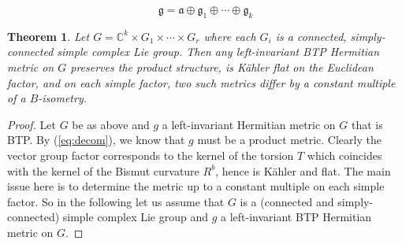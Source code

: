\documentclass[10pt,a4paper]{amsart}
\newtheorem{theorem}{Theorem}
\begin{document}
\begin{equation}
 {\mathfrak g} = {\mathfrak a} \oplus {\mathfrak g}_1 \oplus \cdots \oplus {\mathfrak g}_k \label{eq:decom}
 \end{equation}

\begin{theorem} \label{thm2.6}
Let $G={\mathbb C}^k \times G_1\times \cdots \times G_r$ where each $G_i$ is a connected, simply-connected simple complex Lie group. Then any left-invariant {\rm BTP} Hermitian metric on $G$ preserves the product structure, is K\"ahler flat on the Euclidean factor, and on each simple factor, two such metrics differ by a constant multiple of a $B$-isometry.
\end{theorem}

\begin{proof} Let $G$ be as above and $g$ a left-invariant Hermitian metric on $G$ that is {\rm BTP}. By (\ref{eq:decom}), we know that $g$ must be a product metric. Clearly the vector group factor corresponds to the kernel of the torsion $T$ which coincides with the kernel of the Bismut curvature $R^b$, hence is K\"ahler and flat. The main issue here is to determine the metric up to a constant multiple on each simple factor. So in the following let us assume that $G$ is a (connected and simply-connected) simple complex Lie group and $g$ a left-invariant {\rm BTP} Hermitian metric on $G$.


\end{proof}
\end{document}
